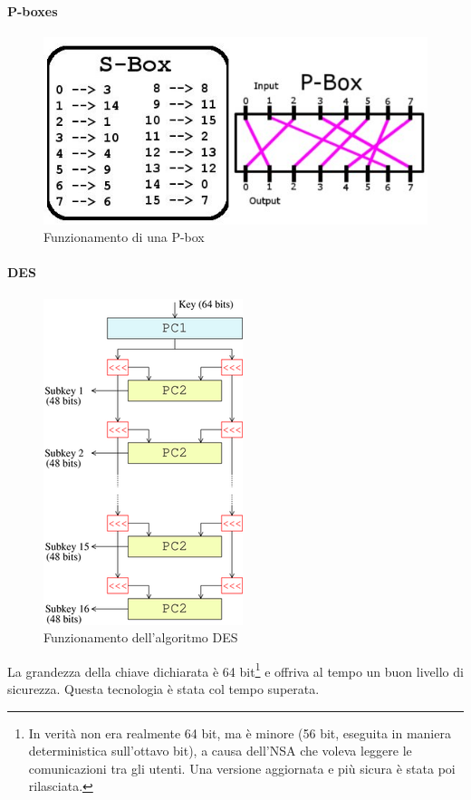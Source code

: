 \paragraph{P-boxes}

\begin{figure}[H]
\centering
\includegraphics[scale=0.3]{res/img/pboxes.png}
\caption{Funzionamento di una P-box}
\label{fig:password:pboxes}
\end{figure}

\paragraph{DES}

\begin{figure}[H]
\centering
\includegraphics[scale=0.5]{res/img/des.png}
\caption{Funzionamento dell'algoritmo DES}
\label{fig:password:des}
\end{figure}

La grandezza della chiave dichiarata è 64 bit\footnote{In verità non era 
realmente 64 bit, ma è minore (56 bit, eseguita in maniera deterministica 
sull'ottavo bit), a causa dell'NSA che voleva leggere le comunicazioni tra gli 
utenti. Una versione aggiornata e più sicura è stata poi rilasciata.} e offriva 
al tempo un buon livello di sicurezza. Questa tecnologia è stata col tempo 
superata.


